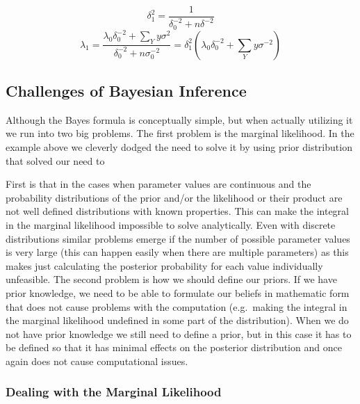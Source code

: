 \documentclass[12pt,a4paper,leqno]{report}
\theoremstyle{plain}
\theoremstyle{definition}
\theoremstyle{remark}
\begin{document}
\begin{def}\label{}
\begin{equation}\label{}
    \delta_1^2
    =
    \frac{1}{\delta_0^{-2}+n\delta^{-2}}
\end{equation}
\begin{equation}\label{}
    \lambda_1
    =
    \frac{
        \lambda_0 \delta_0^{-2} + \sum_{Y} y \sigma^2
    }
    {
        \delta_0^{-2} + n \sigma_0^{-2}
    }
    =
    \delta_1^2
    \left(
        \lambda_0 \delta_0^{-2} + \sum_{Y} y \sigma^{-2}
    \right)
\end{equation}
\end{def}

\subsection{Challenges of Bayesian Inference}\label{bayesproblems}

Although the Bayes formula is conceptually simple, but when actually utilizing it we run into two
big problems. The first problem is the marginal likelihood. In the example above we cleverly
dodged the need to solve it by using prior distribution that solved our need to


First is that in the cases when parameter values are continuous
and the probability distributions of the prior and/or the likelihood or their
product are not well defined distributions with known properties. This can make
the integral in the marginal likelihood impossible to solve analytically.
Even with discrete distributions similar problems emerge if the number of
possible parameter values is very large (this can happen easily when there are multiple
parameters) as this makes just calculating the posterior probability for each value
individually unfeasible. The second problem is how we should define our priors.
If we have prior knowledge, we need to be able to formulate our beliefs in mathematic form that does not cause
problems with the computation (e.g.\ making the integral in the marginal likelihood
undefined in some part of the distribution). When we do not have prior knowledge
we still need to define a prior, but in this case it has to be defined
so that it has minimal effects on the posterior distribution and once
again does not cause computational issues.

\subsubsection{Dealing with the Marginal Likelihood}\label{bayesproblems}
\end{document}
